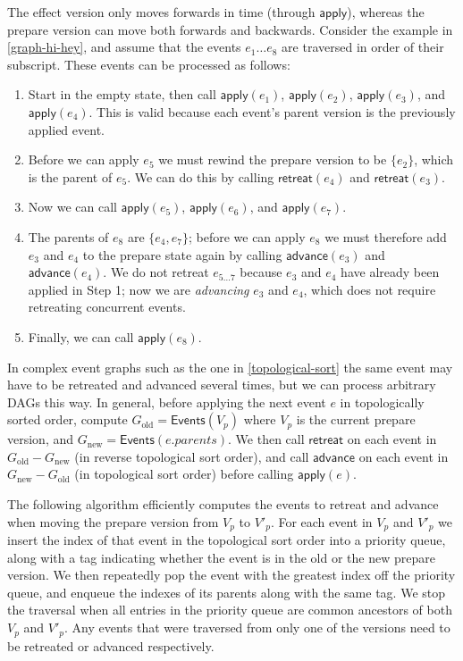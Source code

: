 \documentclass[sigplan,10pt]{acmart}
\begin{document}
The effect version only moves forwards in time (through $\mathsf{apply}$), whereas the prepare version can move both forwards and backwards.
Consider the example in \autoref{graph-hi-hey}, and assume that the events $e_1 \dots e_8$ are traversed in order of their subscript.
These events can be processed as follows:

\begin{enumerate}
\item Start in the empty state, then call $\mathsf{apply}(e_1)$, $\mathsf{apply}(e_2)$, $\mathsf{apply}(e_3)$, and $\mathsf{apply}(e_4)$. This is valid because each event's parent version is the previously applied event.
\item Before we can apply $e_5$ we must rewind the prepare version to be $\{e_2\}$, which is the parent of $e_5$. We can do this by calling $\mathsf{retreat}(e_4)$ and $\mathsf{retreat}(e_3)$.
\item Now we can call $\mathsf{apply}(e_5)$, $\mathsf{apply}(e_6)$, and $\mathsf{apply}(e_7)$.
\item The parents of $e_8$ are $\{e_4, e_7\}$; before we can apply $e_8$ we must therefore add $e_3$ and $e_4$ to the prepare state again by calling $\mathsf{advance}(e_3)$ and $\mathsf{advance}(e_4)$.
    We do not retreat $e_{5\dots 7}$ because $e_3$ and $e_4$ have already been applied in Step 1; now we are \emph{advancing} $e_3$ and $e_4$, which does not require retreating concurrent events.
\item Finally, we can call $\mathsf{apply}(e_8)$.
\end{enumerate}

In complex event graphs such as the one in \autoref{topological-sort} the same event may have to be retreated and advanced several times, but we can process arbitrary DAGs this way.
In general, before applying the next event $e$ in topologically sorted order, compute $G_\mathrm{old} = \mathsf{Events}(V_p)$ where $V_p$ is the current prepare version, and $G_\mathrm{new} = \mathsf{Events}(e.\mathit{parents})$.
We then call $\mathsf{retreat}$ on each event in $G_\mathrm{old} - G_\mathrm{new}$ (in reverse topological sort order), and call $\mathsf{advance}$ on each event in $G_\mathrm{new} - G_\mathrm{old}$ (in topological sort order) before calling $\mathsf{apply}(e)$.

The following algorithm efficiently computes the events to retreat and advance when moving the prepare version from $V_p$ to $V'_p$.
For each event in $V_p$ and $V'_p$ we insert the index of that event in the topological sort order into a priority queue, along with a tag indicating whether the event is in the old or the new prepare version.
We then repeatedly pop the event with the greatest index off the priority queue, and enqueue the indexes of its parents along with the same tag.
We stop the traversal when all entries in the priority queue are common ancestors of both $V_p$ and $V'_p$.
Any events that were traversed from only one of the versions need to be retreated or advanced respectively.
\end{document}
